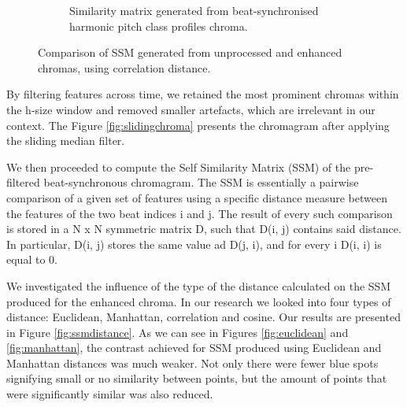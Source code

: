 \begin{figure}
\begin{subfigure}[b]{0.47\textwidth}
                \caption{Similarity matrix generated from beat-synchronised harmonic pitch class profiles chroma.}
                \label{fig:synSSM}
        \end{subfigure}
          \caption{Comparison of SSM generated from unprocessed and enhanced chromas, using correlation distance.}
        \label{fig:ssmcomparison}
\end{figure}

By filtering features across time, we retained the most prominent chromas within the h-size window and removed smaller artefacts, which are irrelevant in our context. The Figure \ref{fig:slidingchroma} presents the chromagram after applying the sliding median filter.

We then proceeded to compute the Self Similarity Matrix (SSM) of the pre-filtered beat-synchronous chromagram. The SSM is essentially a pairwise comparison of a given set of features using a specific distance measure between the features of the two beat indices i and j. The result of every such comparison is stored in a N x N symmetric matrix D, such that D(i, j) contains said distance. In particular, D(i, j) stores the same value ad D(j, i), and for every i D(i, i) is equal to 0.

We investigated the influence of the type of the distance calculated on the SSM produced for the enhanced chroma. In our research we looked into four types of distance: Euclidean, Manhattan, correlation and cosine. Our results are presented in Figure \ref{fig:ssmdistance}. 
As we can see in Figures \ref{fig:euclidean} and \ref{fig:manhattan}, the contrast achieved for SSM produced using Euclidean and Manhattan distances was much weaker. Not only there were fewer blue spots signifying small or no similarity between points, but the amount of points that were significantly similar was also reduced.



